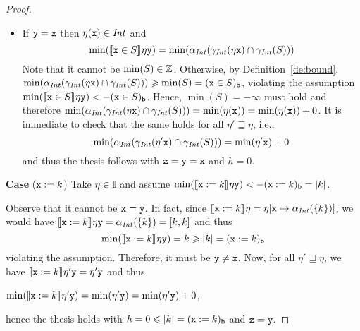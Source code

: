 \begin{proof}
\begin{itemize}
  \item If \(\var[y] = \var[x]\) then \(\eta(\var) \in \Int\) and
    \begin{equation*}
      \min(\semi{\var \in S}\eta \var[y]) = \min(\abstr[\Int](\concr[\Int](\eta\var) \cap \concr[\Int](S)))
    \end{equation*}
    Note that it cannot be \(\min(S)\in \z\). Otherwise, by
    Definition~\ref{de:bound},
    \(\min ({\abstr[\Int](\concr[\Int](\eta\var) \cap \concr[\Int](S))})
    \geq \min(S)= \lbound{\var \in S}\), violating the assumption
    \(\min(\semi{\var \in S}\eta \var[y]) < - \lbound{\var \in S}\).
    Hence, \(\min(S) = -\infty\) must hold and therefore %
    \(\min ({\abstr[\Int](\concr[\Int](\eta\var) \cap
      \concr[\Int](S))}) = \min(\eta(\var)) = \min(\eta(\var)) +
    0\). It is immediate to check that the same holds for all
    \(\eta' \sqsupseteq \eta\), i.e.,
    \begin{equation*}
      \min(\abstr[\Int](\concr[\Int](\eta'\var) \cap \concr[\Int](S))) = \min(\eta'\var) + 0
    \end{equation*}
    and thus the thesis follows with  \(\var[z]=\var[y]=\var[x]\) and \(h=0\).
  \end{itemize}  
  
  \medskip
  
  \noindent
  \textbf{Case} (\(\var := k\))
  Take \(\eta \in \inte\) and assume
  \(\min(\semi{\var := k}\eta \var[y]) < -\lbound{\var := k} = |k|\).

  Observe that it cannot be \(\var = \var[y]\). In fact, since
  \(\semi{\var := k}\eta = \eta[\var \mapsto \abstr[\Int](\{k\})]\),
  we would have
  \(\semi{\var := k}\eta \var[y] = \abstr[\Int](\{k\}) =
  \interval{k}{k}\) and thus %
  \begin{equation*}
    \min(\semi{\var := k}\eta \var[y]) = k \geq |k| = \lbound{\var := k}
  \end{equation*}
  violating the assumption.
  Therefore, it must be \(\var[y] \neq \var\). Now, for all
  \(\eta' \sqsupseteq \eta\), we have
  \(\semi{\var := k}\eta' \var[y] = \eta' \var[y]\) and thus
  \begin{center}
    \(\min(\semi{\var := k}\eta' \var[y]) = \min(\eta' \var[y]) =
    \min(\eta' \var[y]) + 0\),
  \end{center}
  hence the thesis holds with \(h =0 \leq |k| = \lbound{\var :=k}\)
  and \(\var[z] = \var[y]\).
  

\end{proof}

